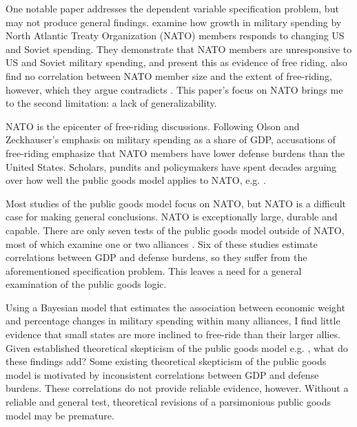 \documentclass[12pt]{article}
\begin{document}
One notable paper addresses the dependent variable specification problem, but may not produce general findings. 
\citet{PluemperNeumayer2015} examine how growth in military spending by North Atlantic Treaty Organization (NATO) members responds to changing US and Soviet spending.
They demonstrate that NATO members are unresponsive to US and Soviet military spending, and present this as evidence of free riding.
\citet{PluemperNeumayer2015} also find no correlation between NATO member size and the extent of free-riding, however, which they argue contradicts \citet{OlsonZeckhauser1966}.
This paper's focus on NATO brings me to the second limitation: a lack of generalizability. 


NATO is the epicenter of free-riding discussions. 
Following Olson and Zeckhauser's emphasis on military spending as a share of GDP, accusations of free-riding emphasize that NATO members have lower defense burdens than the United States. 
Scholars, pundits and policymakers have spent decades arguing over how well the public goods model applies to NATO, e.g. \citep{Pryor1968, SandlerForbes1980, Palmer1990, HiltonVhu1991, Boyer1993, GatesTerasawa1992, SandlerHartley2001, Lanoszka2015, PluemperNeumayer2015, KimSandler2019}.


Most studies of the public goods model focus on NATO, but NATO is a difficult case for making general conclusions. 
NATO is exceptionally large, durable and capable. 
There are only seven tests of the public goods model outside of NATO, most of which examine one or two alliances \citep{Russett1970, Starr1974, Reisinger1983, Thies1987, ConybeareSandler1990, OnealWhatley1996, Siroky2012}. 
Six of these studies estimate correlations between GDP and defense burdens, so they suffer from the aforementioned specification problem.
This leaves a need for a general examination of the public goods logic. 



Using a Bayesian model that estimates the association between economic weight and percentage changes in military spending within many alliances, I find little evidence that small states are more inclined to free-ride than their larger allies.
Given established theoretical skepticism of the public goods model e.g. \citep{Palmer1990, GatesTerasawa1992, SandlerHartley2001, Norrlof2010, NiouZeigler2019}, what do these findings add? 
Some existing theoretical skepticism of the public goods model is motivated by inconsistent correlations between GDP and defense burdens. 
These correlations do not provide reliable evidence, however. 
Without a reliable and general test, theoretical revisions of a parsimonious public goods model may be premature.
\end{document}
